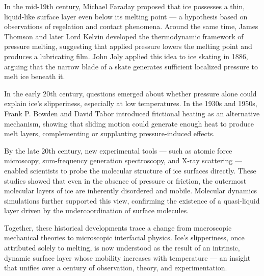 \begin{historical}
In the mid-19th century, Michael Faraday proposed that ice possesses a thin, liquid-like surface layer even below its melting point — a hypothesis based on observations of regelation and contact phenomena. Around the same time, James Thomson and later Lord Kelvin developed the thermodynamic framework of pressure melting, suggesting that applied pressure lowers the melting point and produces a lubricating film. John Joly applied this idea to ice skating in 1886, arguing that the narrow blade of a skate generates sufficient localized pressure to melt ice beneath it.

In the early 20th century, questions emerged about whether pressure alone could explain ice's slipperiness, especially at low temperatures. In the 1930s and 1950s, Frank P. Bowden and David Tabor introduced frictional heating as an alternative mechanism, showing that sliding motion could generate enough heat to produce melt layers, complementing or supplanting pressure-induced effects.

By the late 20th century, new experimental tools — such as atomic force microscopy, sum-frequency generation spectroscopy, and X-ray scattering — enabled scientists to probe the molecular structure of ice surfaces directly. These studies showed that even in the absence of pressure or friction, the outermost molecular layers of ice are inherently disordered and mobile. Molecular dynamics simulations further supported this view, confirming the existence of a quasi-liquid layer driven by the undercoordination of surface molecules.

Together, these historical developments trace a change from macroscopic mechanical theories to microscopic interfacial physics. Ice’s slipperiness, once attributed solely to melting, is now understood as the result of an intrinsic, dynamic surface layer whose mobility increases with temperature — an insight that unifies over a century of observation, theory, and experimentation.
\end{historical}
